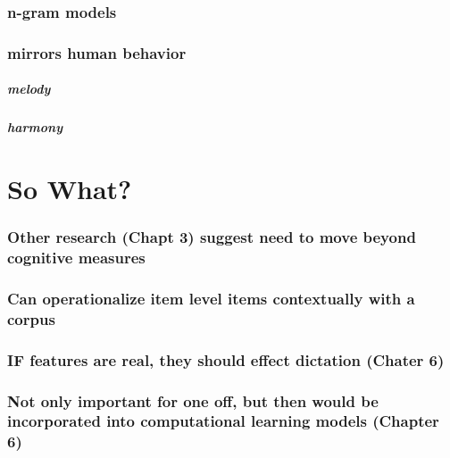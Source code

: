 \documentclass[]{book}
\let\oldsubparagraph\subparagraph
\renewcommand{\subparagraph}[1]{\oldsubparagraph{#1}\mbox{}}
\theoremstyle{definition}
\theoremstyle{definition}
\theoremstyle{definition}
\theoremstyle{remark}
\begin{document}
\hypertarget{n-gram-models}{%
\subsubsection{n-gram models}\label{n-gram-models}}

\hypertarget{mirrors-human-behavior}{%
\subsubsection{mirrors human behavior}\label{mirrors-human-behavior}}

\hypertarget{melody}{%
\subparagraph{melody}\label{melody}}

\hypertarget{harmony}{%
\subparagraph{harmony}\label{harmony}}

\hypertarget{so-what}{%
\section{So What?}\label{so-what}}

\hypertarget{other-research-chapt-3-suggest-need-to-move-beyond-cognitive-measures}{%
\subsubsection{Other research (Chapt 3) suggest need to move beyond
cognitive
measures}\label{other-research-chapt-3-suggest-need-to-move-beyond-cognitive-measures}}

\hypertarget{can-operationalize-item-level-items-contextually-with-a-corpus}{%
\subsubsection{Can operationalize item level items contextually with a
corpus}\label{can-operationalize-item-level-items-contextually-with-a-corpus}}

\hypertarget{if-features-are-real-they-should-effect-dictation-chater-6}{%
\subsubsection{IF features are real, they should effect dictation
(Chater
6)}\label{if-features-are-real-they-should-effect-dictation-chater-6}}

\hypertarget{not-only-important-for-one-off-but-then-would-be-incorporated-into-computational-learning-models-chapter-6}{%
\subsubsection{Not only important for one off, but then would be
incorporated into computational learning models (Chapter
6)}\label{not-only-important-for-one-off-but-then-would-be-incorporated-into-computational-learning-models-chapter-6}}
\end{document}
